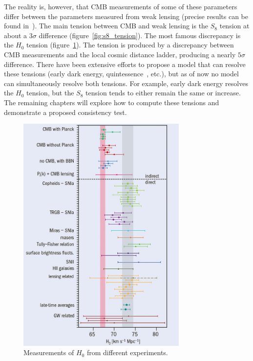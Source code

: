 The reality is, however, that CMB measurements of some of these parameters differ between the parameters measured from weak lensing (precise results can be found in~\cite{amon_dark_2022,noauthor_planck_2018}). The main tension between CMB and weak lensing is the $S_8$ tension at about a $3\sigma$ difference (figure~\ref{fig:s8_tension}). The most famous discrepancy is the $H_0$ tension (figure~\ref{fig:h0_tension}). The tension is produced by a discrepancy between CMB measurements and the local cosmic distance ladder, producing a nearly $5\sigma$ difference.  There have been extensive efforts to propose a model that can resolve these tensions (early dark energy\cite{kamionkowski_hubble_2022}, quintessence~\cite{tsujikawa_quintessence_2013}, etc.), but as of now no model can simultaneously resolve both tensions. For example, early dark energy resolves the $H_0$ tension, but the $S_8$ tension tends to either remain the same or increase. The remaining chapters will explore how to compute these tensions and demonstrate a proposed consistency test.
\begin{figure}[ht]
	\centering
	\includegraphics[width=0.75\textwidth]{plots/h0_tension_4x.jpeg}
	\caption{Measurements of $H_0$ from different experiments.}
	\label{fig:h0_tension}
\end{figure}
